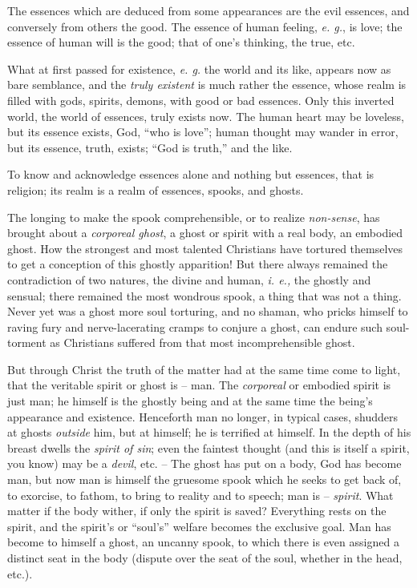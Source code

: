 \documentclass[12pt,a4paper]{book}
\begin{document}
The essences which are deduced from some appearances are the evil essences, 
and conversely from others the good. The essence of human feeling, \textit{e. 
g.}, is love; the essence of human will is the good; that of one's thinking, 
the true, etc.

What at first passed for existence, \textit{e. g.} the world and its like, 
appears now as bare semblance, and the \textit{truly existent} is much rather 
the essence, whose realm is filled with gods, spirits, demons, with good or 
bad essences. Only this inverted world, the world of essences, truly exists 
now. The human heart may be loveless, but its essence exists, God, ``who is 
love''; human thought may wander in error, but its essence, truth, exists; 
``God is truth,'' and the like.

To know and acknowledge essences alone and nothing but essences, that is 
religion; its realm is a realm of essences, spooks, and ghosts.

The longing to make the spook comprehensible, or to realize 
\textit{non-sense}, has brought about a \textit{corporeal ghost}, a ghost or 
spirit with a real body, an embodied ghost. How the strongest and most 
talented Christians have tortured themselves to get a conception of this 
ghostly apparition! But there always remained the contradiction of two 
natures, the divine and human, \textit{i. e.,} the ghostly and sensual; there 
remained the most wondrous spook, a thing that was not a thing. Never yet was 
a ghost more soul torturing, and no shaman, who pricks himself to raving fury 
and nerve-lacerating cramps to conjure a ghost, can endure such soul-torment 
as Christians suffered from that most incomprehensible ghost.

But through Christ the truth of the matter had at the same time come to light, 
that the veritable spirit or ghost is -- man. The \textit{corporeal} or 
embodied spirit is just man; he himself is the ghostly being and at the same 
time the being's appearance and existence. Henceforth man no longer, in 
typical cases, shudders at ghosts \textit{outside} him, but at himself; he is 
terrified at himself. In the depth of his breast dwells the \textit{spirit of 
sin}; even the faintest thought (and this is itself a spirit, you know) may be 
a \textit{devil}, etc. -- The ghost has put on a body, God has become man, but 
now man is himself the gruesome spook which he seeks to get back of, to 
exorcise, to fathom, to bring to reality and to speech; man is -- 
\textit{spirit}. What matter if the body wither, if only the spirit is saved? 
Everything rests on the spirit, and the spirit's or ``soul's'' welfare 
becomes the exclusive goal. Man has become to himself a ghost, an uncanny 
spook, to which there is even assigned a distinct seat in the body (dispute 
over the seat of the soul, whether in the head, etc.).
\end{document}
